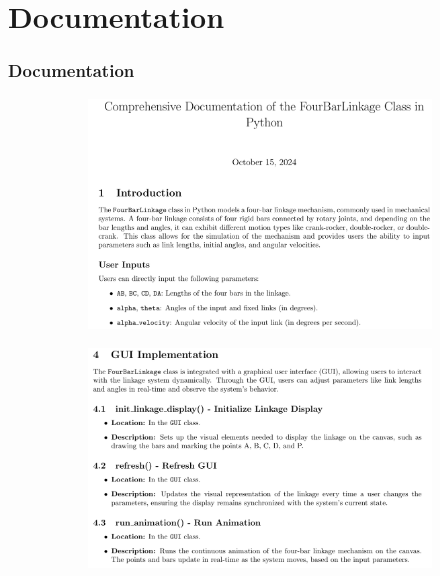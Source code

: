 \documentclass[ucs,10pt]{beamer}
\begin{document}
\section{Documentation}

\begin{frame}
\frametitle{Documentation}
	\begin{figure}
		\centering
		\begin{subfigure}[b]{0.45\textwidth}
			\centering
			\includegraphics[width=\textwidth]{./Figures/Docs/four_bar_linkage.png}
		\end{subfigure}
		\hfill
		\begin{subfigure}[b]{0.45\textwidth}
			\centering
			\includegraphics[width=\textwidth]{./Figures/Docs/GUI.png}
		\end{subfigure}
		\vfill
		\begin{subfigure}[b]{0.45\textwidth}
			\centering

\end{subfigure}
\end{figure}
\end{frame}
\end{document}
